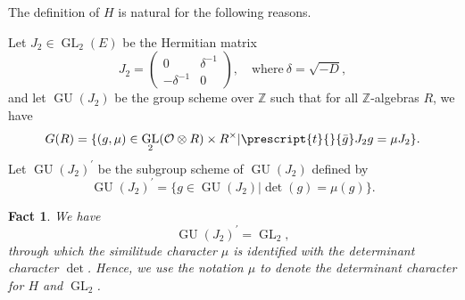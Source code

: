 \documentclass[11pt, a4paper]{amsart}
\theoremstyle{plain}
\newtheorem{fact}[theorem]{Fact}
\theoremstyle{definition}
\numberwithin{equation}{section}
\DeclareMathOperator{\GU}{GU}
\DeclareMathOperator{\GL}{\mathrm{GL}}
\begin{document}
The definition of $H$ is natural for the following reasons. 
\par Let $J_2 \in \GL_2(E)$ be the Hermitian matrix 
            \[
                J_2 = \begin{pmatrix} 
                     0 & \delta^{-1} \\
                    -\delta^{-1} & 0
                    \end{pmatrix}, \quad \mathrm{where} \ \delta = \sqrt{-D}, 
            \]
            and let $\GU(J_2)$ be the group scheme over $\mathbb{Z}$ such that for all $\mathbb{Z}$-algebras $R$, we have 
            \[
                G(R) = \{(g, \mu) \in \GL_2(\mathcal{O} \otimes R) \times R^{\times} | \prescript{t}{}{\bar{g}}J_2g = \mu J_2\}. 
            \]
Let $\GU(J_2)^{\prime}$ be the subgroup scheme of $\GU(J_2)$ defined by  
\begin{equation*}
        \GU(J_2)^{\prime} = \{ g \in \GU(J_2)| \det(g) = \mu(g) \}. 
\end{equation*}
\begin{fact}
    We have
    \begin{equation*}
        \GU(J_2)^{\prime} = \GL_2, 
    \end{equation*}
    through which the similitude character $\mu$ is identified with the determinant character $\det$. Hence, we use the notation $\mu$ to denote the determinant character for $H$ and $\GL_2$. 
    
\end{fact}
\end{document}
